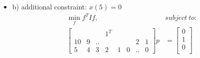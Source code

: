 \documentclass[12pt,letter]{article}
\begin{document}
\begin{enumerate}
\begin{itemize}
  \item b) additional constraint: $x(5) = 0$\\
    \begin{align*}
      \min_{f} f^TIf,\ &subject\ to:\\
      \begin{bmatrix}
        & & & 1^T & & & &\\
        10 & 9 & .. &&& & 2 & 1\\
        5 & 4 & 3 & 2 & 1 & 0 & .. & 0
      \end{bmatrix} p &=
      \begin{bmatrix}
        0\\
        1\\
        0\\
      \end{bmatrix}\\
    \end{align*}


\end{itemize}
\end{enumerate}
\end{document}
